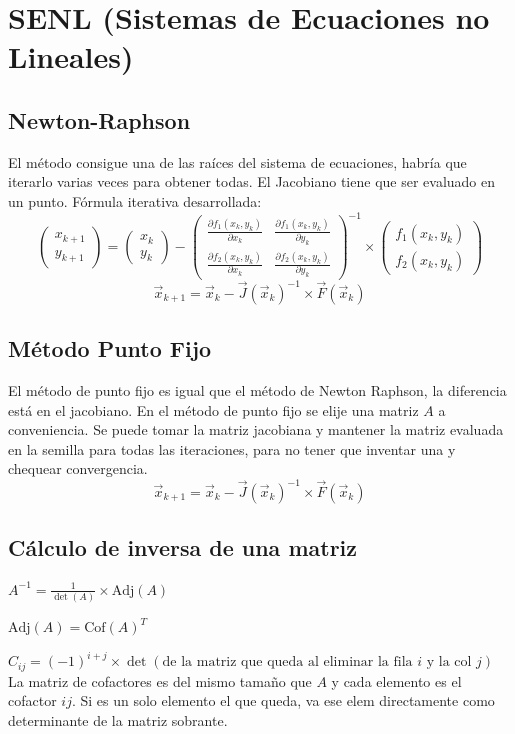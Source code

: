 \section{SENL (Sistemas de Ecuaciones no Lineales)}
\subsection{Newton-Raphson}
El método consigue una de las raíces del sistema de ecuaciones, habría que iterarlo varias veces para obtener todas.
El Jacobiano tiene que ser evaluado en un punto.
Fórmula iterativa desarrollada:
\begin{equation}
\begin{pmatrix}
    x_{k+1}\\y_{k+1}
\end{pmatrix}=\begin{pmatrix}
    x_k\\y_k
\end{pmatrix}-\begin{pmatrix}
  \frac{\partial f_1(x_k,y_k)}{\partial x_k} & \frac{\partial f_1(x_k,y_k)}{\partial y_k} \\ 
  \frac{\partial f_2(x_k,y_k)}{\partial x_k} & \frac{\partial f_2(x_k,y_k)}{\partial y_k} 
\end{pmatrix}^{-1}\times \begin{pmatrix}
    f_1(x_k,y_k)\\f_2(x_k,y_k)
\end{pmatrix}
\end{equation}
\begin{equation}
\vec{x}_{k+1}=\vec{x}_k-\vec{J}(\vec{x}_k)^{-1}\times\vec{F}(\vec{x}_k)
\end{equation}

\subsection{Método Punto Fijo}
El método de punto fijo es igual que el método de Newton Raphson, la diferencia está en el jacobiano. En el método de punto fijo se elije una matriz $A$ a conveniencia.
Se puede tomar la matriz jacobiana y mantener la matriz evaluada en la semilla para todas las iteraciones, para no tener que inventar una y chequear convergencia.
\begin{equation}
\vec{x}_{k+1}=\vec{x}_k-\vec{J}(\vec{x}_k)^{-1}\times\vec{F}(\vec{x}_k)
\end{equation}

\subsection{Cálculo de inversa de una matriz}
$A^{-1}=\frac1{\det(A)}\times \text{Adj}(A)$

$\text{Adj}(A)=\text{Cof}(A)^T$

$C_{ij}=(-1)^{i+j} \times \det(\text{de la matriz que queda al eliminar la fila $i$ y la col $j$})$
La matriz de cofactores es del mismo tamaño que $A$ y cada elemento es el cofactor $ij$.
Si es un solo elemento el que queda, va ese elem directamente como determinante de la matriz sobrante.